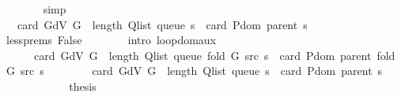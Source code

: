 \begin{isabellebody}
\ \ \ \ \ \ \isamarkupfalse%
\ simp\isanewline
\ \ \ \ \isamarkupfalse%
\ \isamarkupfalse%
\ {\isachardoublequoteopen}{\isachardot}{\kern0pt}{\isachardot}{\kern0pt}{\isachardot}{\kern0pt}\ {\isacharless}{\kern0pt}\ card\ {\isacharparenleft}{\kern0pt}G{\isachardot}{\kern0pt}dV\ G{\isacharparenright}{\kern0pt}\ {\isacharplus}{\kern0pt}\ length\ {\isacharparenleft}{\kern0pt}Q{\isacharunderscore}{\kern0pt}list\ {\isacharparenleft}{\kern0pt}queue\ s{\isacharparenright}{\kern0pt}{\isacharparenright}{\kern0pt}\ {\isacharminus}{\kern0pt}\ card\ {\isacharparenleft}{\kern0pt}P{\isachardot}{\kern0pt}dom\ {\isacharparenleft}{\kern0pt}parent\ s{\isacharparenright}{\kern0pt}{\isacharparenright}{\kern0pt}{\isachardoublequoteclose}\isanewline
\ \ \ \ \ \ \isamarkupfalse%
\ less{\isachardot}{\kern0pt}prems\ False\isanewline
\ \ \ \ \ \ \isamarkupfalse%
\ {\isacharparenleft}{\kern0pt}intro\ loop{\isacharunderscore}{\kern0pt}dom{\isacharunderscore}{\kern0pt}aux{\isacharunderscore}{\kern0pt}{}{\isacharparenright}{\kern0pt}\isanewline
\ \ \ \ \isamarkupfalse%
\ \isamarkupfalse%
\isanewline
\ \ \ \ \ \ {\isachardoublequoteopen}card\ {\isacharparenleft}{\kern0pt}G{\isachardot}{\kern0pt}dV\ G{\isacharparenright}{\kern0pt}\ {\isacharplus}{\kern0pt}\ length\ {\isacharparenleft}{\kern0pt}Q{\isacharunderscore}{\kern0pt}list\ {\isacharparenleft}{\kern0pt}queue\ {\isacharparenleft}{\kern0pt}fold\ G\ src\ s{\isacharparenright}{\kern0pt}{\isacharparenright}{\kern0pt}{\isacharparenright}{\kern0pt}\ {\isacharminus}{\kern0pt}\ card\ {\isacharparenleft}{\kern0pt}P{\isachardot}{\kern0pt}dom\ {\isacharparenleft}{\kern0pt}parent\ {\isacharparenleft}{\kern0pt}fold\ G\ src\ s{\isacharparenright}{\kern0pt}{\isacharparenright}{\kern0pt}{\isacharparenright}{\kern0pt}\ {\isacharless}{\kern0pt}\isanewline
\ \ \ \ \ \ \ card\ {\isacharparenleft}{\kern0pt}G{\isachardot}{\kern0pt}dV\ G{\isacharparenright}{\kern0pt}\ {\isacharplus}{\kern0pt}\ length\ {\isacharparenleft}{\kern0pt}Q{\isacharunderscore}{\kern0pt}list\ {\isacharparenleft}{\kern0pt}queue\ s{\isacharparenright}{\kern0pt}{\isacharparenright}{\kern0pt}\ {\isacharminus}{\kern0pt}\ card\ {\isacharparenleft}{\kern0pt}P{\isachardot}{\kern0pt}dom\ {\isacharparenleft}{\kern0pt}parent\ s{\isacharparenright}{\kern0pt}{\isacharparenright}{\kern0pt}{\isachardoublequoteclose}\isanewline
\ \ \ \ \ \ \isacommand{{\isachardot}{\kern0pt}}\isamarkupfalse%
\isanewline
\ \ \ \ \isamarkupfalse%
\ {\isacharquery}{\kern0pt}thesis\isanewline

\end{isabellebody}
